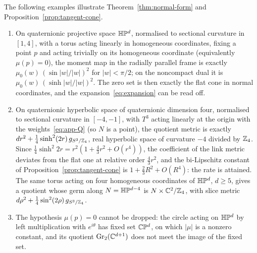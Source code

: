 \begin{remark}\label{rem:examples}
The following examples illustrate Theorem~\ref{thm:normal-form} and
Proposition~\ref{prop:tangent-cone}.
\begin{enumerate}
\item On quaternionic projective space $\mathbb H\mathbb P^d$, normalised to sectional curvature in
 $[1,4]$, with a torus acting linearly in homogeneous coordinates, fixing a point $p$ and
 acting trivially on its homogeneous coordinate (equivalently $\mu(p)=0$), the moment map in the
 radially parallel frame is exactly $\mu_0(w)\,(\sin|w|/|w|)^2$ for $|w|<\pi/2$; on the
 noncompact dual it is $\mu_0(w)\,(\sinh|w|/|w|)^2$. The zero set is then exactly the flat
 cone in normal coordinates, and the expansion~\eqref{eq:expansion} can be read off.
\item On quaternionic hyperbolic space of quaternionic dimension four, normalised to sectional
 curvature in $[-4,-1]$, with $T^3$ acting linearly at the origin with the
 weights~\eqref{eq:app-Q} (so $N$ is a point), the quotient metric is exactly
 $dr^2+\tfrac14\sinh^2(2r)\,g_{S^3/\mathbb Z_4}$, real hyperbolic space of curvature $-4$ divided by
 $\mathbb Z_4$. Since $\tfrac14\sinh^2 2r=r^2(1+\tfrac43r^2+O(r^4))$, the coefficient of the link
 metric deviates from the flat one at relative order $\tfrac43r^2$, and the bi-Lipschitz constant
 of Proposition~\ref{prop:tangent-cone} is $1+\tfrac23R^2+O(R^4)$: the rate is attained. The same
 torus acting on four homogeneous coordinates of $\mathbb H\mathbb P^d$, $d\ge5$, gives a quotient
 whose germ along $N=\mathbb H\mathbb P^{d-4}$ is $N\times\mathbb C^2/\mathbb Z_4$, with slice metric
 $d\rho^2+\tfrac14\sin^2(2\rho)\,g_{S^3/\mathbb Z_4}$.
\item The hypothesis $\mu(p)=0$ cannot be dropped: the circle acting on $\mathbb H\mathbb P^d$ by
 left multiplication with $e^{i\theta}$ has fixed set $\mathbb C\mathbb P^d$, on which $|\mu|$ is a
 nonzero constant, and its quotient $\operatorname{Gr}_2(\mathbb C^{d+1})$ does not meet the image of
 the fixed set.
\end{enumerate}
\end{remark}

